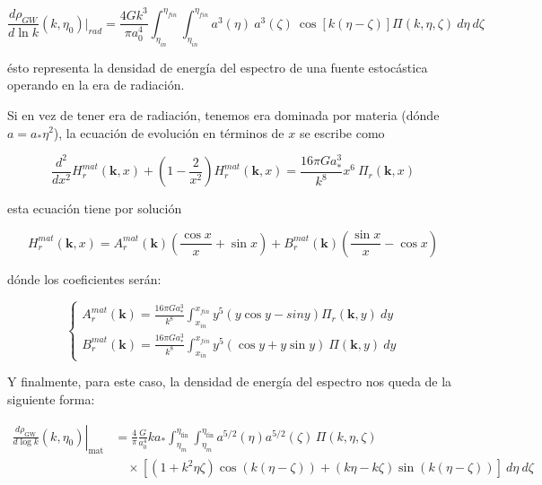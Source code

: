 \begin{equation}
    \frac{d \rho_{GW}}{d \ln k} (k, \eta_0) \bigg|_{rad}= \frac{4 G k^3}{\pi a_0^4} \int_{\eta_{in}}^{\eta_{fin}} \int_{\eta_{in}}^{\eta_{fin}} a^3 (\eta) \ a^3 (\zeta) \ \cos\left[k (\eta - \zeta) \right] \Pi (k, \eta, \zeta) \ d\eta \ d\zeta
\end{equation}

\noindent
ésto representa la densidad de energía del espectro de una fuente estocástica operando en la era de radiación.

Si en vez de tener era de radiación, tenemos era dominada por materia (dónde $a = a_* \eta^2$), la ecuación de evolución en términos de $x$ se escribe como

\begin{equation}
    \frac{d^2}{dx^2} H_r^{mat} (\textbf{k}, x) + \left(1 - \frac{2}{x^2} \right) H_r^{mat} (\textbf{k}, x) = \frac{16 \pi G a_*^3}{k^8} x^6 \ \Pi_r (\textbf{k}, x) 
\end{equation}

\noindent
esta ecuación tiene por solución 

\begin{equation}
    H_r^{mat} (\textbf{k}, x) = A_r^{mat} (\textbf{k}) \left( \frac{\cos x}{x} + \sin x \right) + B_r^{mat} (\textbf{k}) \left( \frac{\sin x}{x} - \cos x \right)
\end{equation}

\noindent
dónde los coeficientes serán:

\begin{equation}
    \begin{cases}
        \displaystyle A_r^{mat} (\textbf{k}) = \frac{16 \pi G a_*^3}{k^8} \int_{x_{in}}^{x_{fin}} y^5 \left( y \cos y - sin y \right) \Pi_r (\textbf{k}, y) \ dy\\
        \displaystyle B_r^{mat} (\textbf{k}) = \frac{16 \pi G a_*^3}{k^8} \int_{x_{in}}^{x_{fin}} y^5 \left( \cos y + y \sin y \right) \ \Pi (\textbf{k}, y) \ dy
    \end{cases}
\end{equation}

Y finalmente, para este caso, la densidad de energía del espectro nos queda de la siguiente forma:

\begin{equation}
    \begin{split}
        \left.\frac{d\rho_{\text{GW}}}{d\log k}(k,\eta_0)\right|_{\text{mat}} &= \frac{4}{\pi} \frac{G}{a_0^4} k a_* \int_{\eta_m}^{\eta_{\text{fin}}}   \int_{\eta_m}^{\eta_{\text{fin}}} a^{5/2}(\eta)  a^{5/2}(\zeta)\, \Pi(k,\eta,\zeta) \\
        &\quad \times \left[(1 + k^2\eta\zeta)\cos(k(\eta - \zeta)) + (k\eta - k\zeta)\sin(k(\eta - \zeta))\right] \ d\eta \ d\zeta
    \end{split}
\end{equation}

